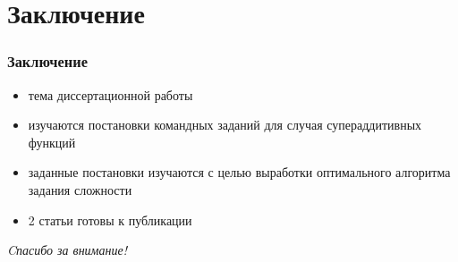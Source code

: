 \section{Заключение}
\begin{frame}
    \frametitle{Заключение}
    
    \begin{itemize}
        \item тема диссертационной работы
        \item изучаются постановки командных заданий для случая супераддитивных функций
        \item заданные постановки изучаются с целью выработки оптимального алгоритма задания сложности
        \item 2 статьи готовы к публикации
    \end{itemize}
\end{frame}


\begin{frame}
    \centering \Large
  \emph{Cпасибо за внимание!}
\end{frame}